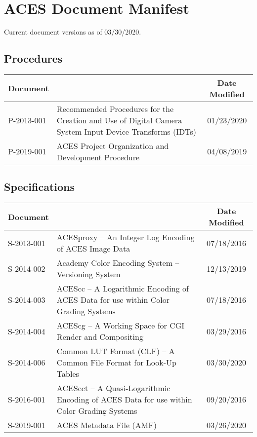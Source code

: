 \documentclass[10pt]{academydoc}
\begin{document}
\regularsectionformat

\section*{ACES Document Manifest}
Current document versions as of 03/30/2020.

\subsection*{Procedures}
\begin{tabularx}{\linewidth}{|l X|c|}
\hline
\textbf{Document} & & \textbf{Date Modified} \\ \hline
P-2013-001 & Recommended Procedures for the Creation and Use of Digital Camera System Input Device Transforms (IDTs) & 01/23/2020 \\ \hline
P-2019-001 & ACES Project Organization and Development Procedure & 04/08/2019 \\ \hline
\end{tabularx}

\subsection*{Specifications}
\begin{tabularx}{\linewidth}{|l X|c|}
\hline
\textbf{Document} & & \textbf{Date Modified} \\ \hline
S-2013-001 & ACESproxy -- An Integer Log Encoding of ACES Image Data & 07/18/2016 \\ \hline
S-2014-002 & Academy Color Encoding System -- Versioning System & 12/13/2019 \\ \hline
S-2014-003 & ACEScc -- A Logarithmic Encoding of ACES Data for use within Color Grading Systems & 07/18/2016 \\ \hline
S-2014-004 & ACEScg -- A Working Space for CGI Render and Compositing & 03/29/2016 \\ \hline
S-2014-006 & Common LUT Format (CLF) -- A Common File Format for Look-Up Tables & 03/30/2020 \\ \hline
S-2016-001 & ACEScct -- A Quasi-Logarithmic Encoding of ACES Data for use within Color Grading Systems & 09/20/2016 \\ \hline
S-2019-001 & ACES Metadata File (AMF) & 03/26/2020 \\ \hline
\end{tabularx}
\end{document}
